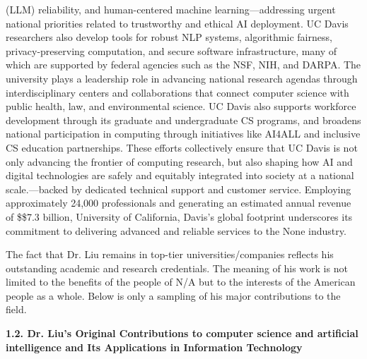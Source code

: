 \documentclass{article}
\begin{document}
(LLM) reliability, and human-centered machine learning—addressing urgent national priorities related to trustworthy and ethical AI deployment. UC Davis researchers also develop tools for robust NLP systems, algorithmic fairness, privacy-preserving computation, and secure software infrastructure, many of which are supported by federal agencies such as the NSF, NIH, and DARPA.  The university plays a leadership role in advancing national research agendas through interdisciplinary centers and collaborations that connect computer science with public health, law, and environmental science. UC Davis also supports workforce development through its graduate and undergraduate CS programs, and broadens national participation in computing through initiatives like AI4ALL and inclusive CS education partnerships. These efforts collectively ensure that UC Davis is not only advancing the frontier of computing research, but also shaping how AI and digital technologies are safely and equitably integrated into society at a national scale.—backed by dedicated technical support and customer service. Employing approximately 24,000 professionals and generating an estimated annual revenue of \$\$7.3 billion, University of California, Davis's global footprint underscores its commitment to delivering advanced and reliable services to the None industry.

The fact that Dr. Liu remains in top-tier universities/companies reflects his outstanding academic and research credentials. The meaning of his work is not limited to the benefits of the people of N/A but to the interests of the American people as a whole. Below is only a sampling of his major contributions to the field.



{\bf 1.2. Dr. Liu's Original Contributions to computer science and artificial intelligence and Its Applications in Information Technology}
\end{document}

